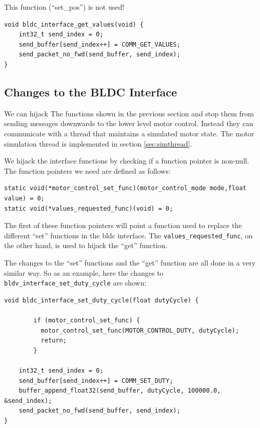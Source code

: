 \documentclass[12pt]{article} %
\begin{document}
This function (``set\_pos'') is not used!

\begin{Verbatim}[samepage=true,frame=single,label=Embedded/RC\_Controller/bldc\_interface.c]
void bldc_interface_get_values(void) {
	int32_t send_index = 0;
	send_buffer[send_index++] = COMM_GET_VALUES;
	send_packet_no_fwd(send_buffer, send_index);
}
\end{Verbatim}


\subsection{Changes to the BLDC Interface}

We can hijack The functions shown in the previous section and stop them from
sending messages downwards to the lower level motor control. Instead they
can communicate with a thread that maintains a simulated motor state. The
motor simulation thread is implemented in section \ref{sec:simthread}. 


We hijack the interface functions by checking if a function pointer is
non-null. The function pointers we need are defined as follows:

\begin{Verbatim}[samepage=true, frame=single, label=Embedded/RC\_Controller/bldc\_interface.c]
static void(*motor_control_set_func)(motor_control_mode mode,float value) = 0;
static void(*values_requested_func)(void) = 0;
\end{Verbatim}

The first of these function pointers will point a function used to replace the different ``set'' functions in the bldc interface. The \verb!values_requested_func!, on the other hand, is used to hijack the ``get'' function.

The changes to the ``set'' functions and the ``get'' function are all
done in a very similar way. So as an example, here the changes to
{\verb!bldv_interface_set_duty_cycle!} are shown:
\begin{Verbatim}[samepage=true, frame=single, label=Embedded/RC\_Controller/bldc\_interface.c]
void bldc_interface_set_duty_cycle(float dutyCycle) {

        if (motor_control_set_func) {
          motor_control_set_func(MOTOR_CONTROL_DUTY, dutyCycle);
          return;
        }
  
	int32_t send_index = 0;
	send_buffer[send_index++] = COMM_SET_DUTY;
	buffer_append_float32(send_buffer, dutyCycle, 100000.0, &send_index);
	send_packet_no_fwd(send_buffer, send_index);
}  
\end{Verbatim} 
\end{document}
